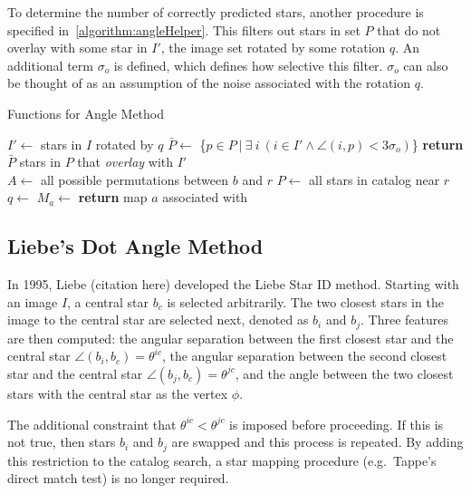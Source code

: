 To determine the number of correctly predicted stars, another procedure is specified in~\autoref{algorithm:angleHelper}.
This filters out stars in set $P$ that do not overlay with some star in $I'$, the image set rotated by some rotation
$q$.
An additional term $\sigma_o$ is defined, which defines how selective this filter.
$\sigma_o$ can also be thought of as an assumption of the noise associated with the rotation $q$.

\begin{algorithm}
    \caption{Functions for Angle Method}\label{algorithm:angleHelper}
    \begin{algorithmic}[1]
        \State $I' \gets$ stars in $I$ rotated by $q$
        \State $\bar{P} \gets $ \{$p \in P \ | \ \exists \ i \ (i \in I' \land \angle (i, p) < 3\sigma_o)$\}
        \State \textbf{return} $\bar{P}$ \Comment stars in $P$ that \textit{overlay} with $I'$
        \EndFunction
        \\
        \State $A \gets $ all possible permutations between $b$ and $r$
        \State $P \gets $ all stars in catalog near $r$
        \\
        \State $q \gets $ 
        \State $M_a \gets $ 
        \EndFor
        \State \textbf{return} map $a$ associated with 
        \EndFunction
    \end{algorithmic}
\end{algorithm}

\subsection{Liebe's Dot Angle Method}\label{subsec:liebe'sDotAngleMethod}
In 1995, Liebe (citation here) developed the Liebe Star ID method.
Starting with an image $I$, a central star $b_c$ is selected arbitrarily.
The two closest stars in the image to the central star are selected next, denoted as $b_i$ and $b_j$.
Three features are then computed: the angular separation between the first closest star and the central star $\angle
(b_i, b_c) = \theta^{ic}$, the angular separation between the second closest star and the central star $\angle (b_j,
b_c) = \theta^{jc}$, and the angle between the two closest stars with the central star as the vertex $\phi$.

The additional constraint that $\theta^{ic} < \theta^{jc}$ is imposed before proceeding.
If this is not true, then stars $b_i$ and $b_j$ are swapped and this process is repeated.
By adding this restriction to the catalog search, a star mapping procedure (e.g.\ Tappe's direct match test) is no
longer required.

